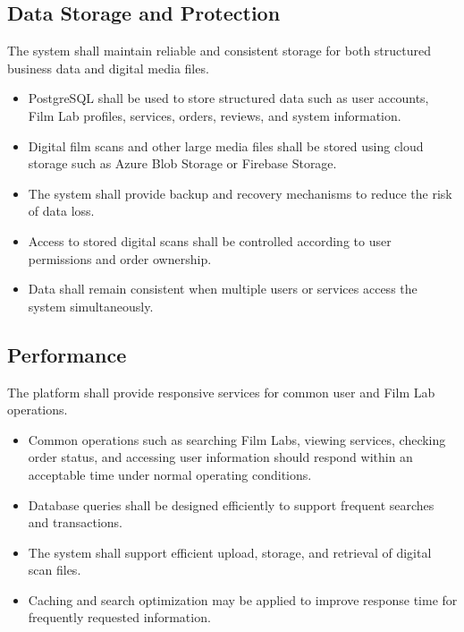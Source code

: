 \subsection{Data Storage and Protection}

The system shall maintain reliable and consistent storage for both structured
business data and digital media files.

\begin{itemize}
    \item PostgreSQL shall be used to store structured data such as user
    accounts, Film Lab profiles, services, orders, reviews, and system
    information.

    \item Digital film scans and other large media files shall be stored using
    cloud storage such as Azure Blob Storage or Firebase Storage.

    \item The system shall provide backup and recovery mechanisms to reduce
    the risk of data loss.

    \item Access to stored digital scans shall be controlled according to
    user permissions and order ownership.

    \item Data shall remain consistent when multiple users or services access
    the system simultaneously.
\end{itemize}

\subsection{Performance}

The platform shall provide responsive services for common user and Film Lab
operations.

\begin{itemize}
    \item Common operations such as searching Film Labs, viewing services,
    checking order status, and accessing user information should respond
    within an acceptable time under normal operating conditions.

    \item Database queries shall be designed efficiently to support frequent
    searches and transactions.

    \item The system shall support efficient upload, storage, and retrieval
    of digital scan files.

    \item Caching and search optimization may be applied to improve response
    time for frequently requested information.
\end{itemize}

